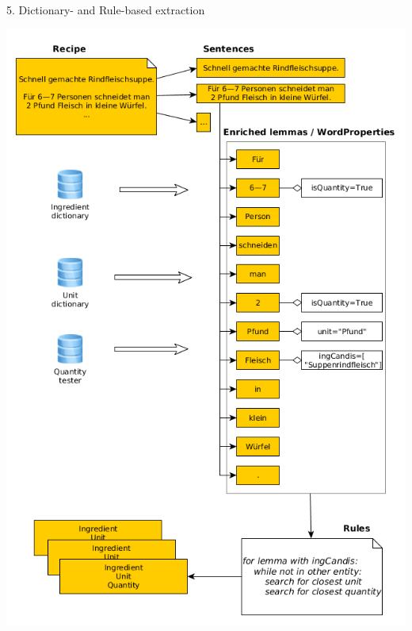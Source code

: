 \documentclass[12pt]{beamer}
\begin{document}
\begin{frame}{5. Dictionary- and Rule-based extraction}
	\vspace{-0.3cm}\begin{center}
		\includegraphics[width=1\linewidth, height=\textheight,keepaspectratio]{../../Images/dictBasedExtraction}
	\end{center}
\end{frame}
\end{document}
